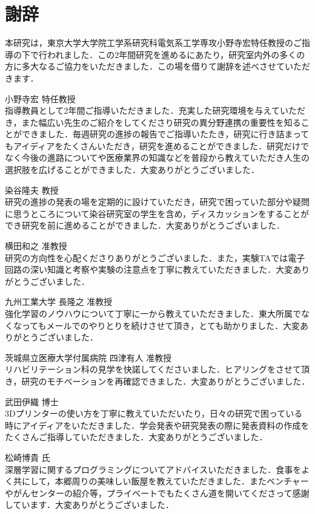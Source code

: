 \chapter{謝辞}
本研究は，東京大学大学院工学系研究科電気系工学専攻小野寺宏特任教授のご指導の下で行われました．この2年間研究を進めるにあたり，研究室内外の多くの方に多大なるご協力をいただきました．この場を借りて謝辞を述べさせていただきます．

小野寺宏 特任教授\\
指導教員として2年間ご指導いただきました．充実した研究環境を与えていただき，また幅広い先生のご紹介をしてくださり研究の異分野連携の重要性を知ることができました．毎週研究の進捗の報告でご指導いたたき，研究に行き詰まってもアイディアをたくさんいただき，研究を進めることができました．研究だけでなく今後の進路についてや医療業界の知識などを普段から教えていただき人生の選択肢を広げることができました．大変ありがとうございました．

染谷隆夫 教授\\
研究の進捗の発表の場を定期的に設けていただき，研究で困っていた部分や疑問に思うところについて染谷研究室の学生を含め，ディスカッションをすることができ研究を前に進めることができました．大変ありがとうございました．

横田和之 准教授\\
研究の方向性を心配くださりありがとうございました．また，実験TAでは電子回路の深い知識と考察や実験の注意点を丁寧に教えていただきました．大変ありがとうございました．

九州工業大学 長隆之 准教授\\
強化学習のノウハウについて丁寧に一から教えていただきました．東大所属でなくなってもメールでのやりとりを続けさせて頂き，とても助かりました．大変ありがとうございました．

\newpage
茨城県立医療大学付属病院 四津有人 准教授\\
リハビリテーション科の見学を快諾してくださいました．ヒアリングをさせて頂き，研究のモチベーションを再確認できました．大変ありがとうございました．

武田伊織 博士\\
3Dプリンターの使い方を丁寧に教えていただいたり，日々の研究で困っている時にアイディアをいただきました．学会発表や研究発表の際に発表資料の作成をたくさんご指導していただきました．大変ありがとうございました．

松崎博貴 氏\\
深層学習に関するプログラミングについてアドバイスいただきました．食事をよく共にして，本郷周りの美味しい飯屋を教えていただきました．またベンチャーやがんセンターの紹介等，プライベートでもたくさん道を開いてくださって感謝しています．大変ありがとうございました．

